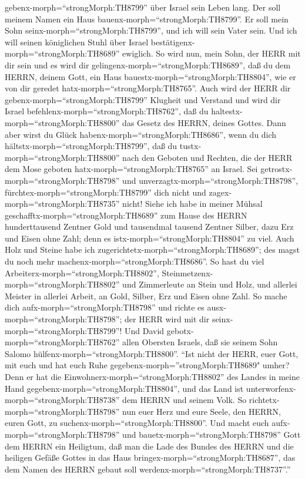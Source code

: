 gebenx-morph=``strongMorph:TH8799'' über Israel sein Leben lang.
 Der soll meinem Namen ein Haus
bauenx-morph=``strongMorph:TH8799''. Er soll mein Sohn
seinx-morph=``strongMorph:TH8799'', und ich will sein Vater sein. Und
ich will seinen königlichen Stuhl über Israel
bestätigenx-morph=``strongMorph:TH8689'' ewiglich.  So wird
nun, mein Sohn, der HERR mit dir sein und es wird dir
gelingenx-morph=``strongMorph:TH8689'', daß du dem HERRN, deinem Gott,
ein Haus bauestx-morph=``strongMorph:TH8804'', wie er von dir geredet
hatx-morph=``strongMorph:TH8765''.  Auch wird der HERR dir
gebenx-morph=``strongMorph:TH8799'' Klugheit und Verstand und wird dir
Israel befehlenx-morph=``strongMorph:TH8762'', daß du
haltestx-morph=``strongMorph:TH8800'' das Gesetz des HERRN, deines
Gottes.  Dann aber wirst du Glück
habenx-morph=``strongMorph:TH8686'', wenn du dich
hältstx-morph=``strongMorph:TH8799'', daß du
tustx-morph=``strongMorph:TH8800'' nach den Geboten und Rechten, die der
HERR dem Mose geboten hatx-morph=``strongMorph:TH8765'' an Israel. Sei
getrostx-morph=``strongMorph:TH8798'' und
unverzagtx-morph=``strongMorph:TH8798'',
fürchtex-morph=``strongMorph:TH8799'' dich nicht und
zagex-morph=``strongMorph:TH8735'' nicht!  Siehe ich habe
in meiner Mühsal geschafftx-morph=``strongMorph:TH8689'' zum Hause des
HERRN hunderttausend Zentner Gold und tausendmal tausend Zentner Silber,
dazu Erz und Eisen ohne Zahl; denn es istx-morph=``strongMorph:TH8804''
zu viel. Auch Holz und Steine habe ich
zugerichtetx-morph=``strongMorph:TH8689''; des magst du noch mehr
machenx-morph=``strongMorph:TH8686''.  So hast du viel
Arbeiterx-morph=``strongMorph:TH8802'',
Steinmetzenx-morph=``strongMorph:TH8802'' und Zimmerleute an Stein und
Holz, und allerlei Meister in allerlei Arbeit,  an Gold,
Silber, Erz und Eisen ohne Zahl. So mache dich
aufx-morph=``strongMorph:TH8798'' und richte es
ausx-morph=``strongMorph:TH8798''; der HERR wird mit dir
seinx-morph=``strongMorph:TH8799''!  Und David
gebotx-morph=``strongMorph:TH8762'' allen Obersten Israels, daß sie
seinem Sohn Salomo hülfenx-morph=``strongMorph:TH8800''. 
``Ist nicht der HERR, euer Gott, mit euch und hat euch Ruhe
gegebenx-morph=''strongMorph:TH8689" umher? Denn er hat die
Einwohnerx-morph=``strongMorph:TH8802'' des Landes in meine Hand
gegebenx-morph=``strongMorph:TH8804'', und das Land ist
unterworfenx-morph=``strongMorph:TH8738'' dem HERRN und seinem Volk.
 So richtetx-morph=``strongMorph:TH8798'' nun euer Herz und
eure Seele, den HERRN, euren Gott, zu
suchenx-morph=``strongMorph:TH8800''. Und macht euch
aufx-morph=``strongMorph:TH8798'' und
bauetx-morph=``strongMorph:TH8798'' Gott dem HERRN ein Heiligtum, daß
man die Lade des Bundes des HERRN und die heiligen Gefäße Gottes in das
Haus bringex-morph=``strongMorph:TH8687'', das dem Namen des HERRN
gebaut soll werdenx-morph=``strongMorph:TH8737''.''

